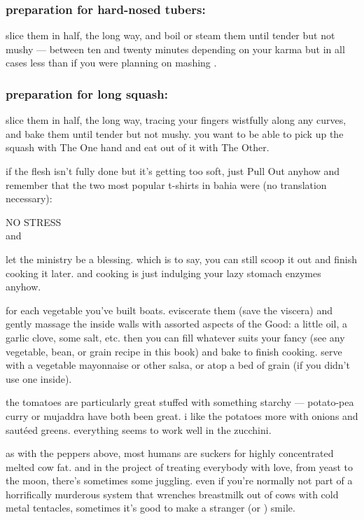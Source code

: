 \subsubsection{preparation for hard-nosed tubers:}
slice them in half, the long way, and boil or steam them until tender but not 
mushy --- between ten and twenty minutes depending on your karma but in all 
cases less than if you were planning on mashing .

\subsubsection{preparation for long squash:}
slice them in half, the long way, tracing your fingers wistfully along any 
curves, and bake them until tender but not mushy. you want to be able to pick 
up the squash with The One hand and eat out of it with The Other.

if the flesh isn't fully done but it's getting too soft, just Pull Out anyhow 
and remember that the two most popular t-shirts in bahia were (no translation 
necessary):

\mbox{\hskip2cm}\textsf{NO STRESS}\\
\mbox{\hskip1cm}and\\
\mbox{\hskip2cm}\textsf{}

let the ministry be a blessing. which is to say, you can still scoop it out 
and finish cooking it later. and cooking is just indulging your lazy stomach 
enzymes anyhow. 

for each vegetable you've built boats. eviscerate them (save the viscera) and 
gently massage the inside walls with assorted aspects of the Good: a little 
oil, a garlic clove, some salt, etc. then you can fill whatever suits your 
fancy (see any vegetable, bean, or grain recipe in this book) and bake to 
finish cooking. serve with a vegetable mayonnaise or other salsa, or atop a 
bed of grain (if you didn't use one inside).

the tomatoes are particularly great stuffed with something starchy --- 
potato-pea curry or \gls{mujaddra} have both been 
great. i like the potatoes more with onions and saut\'{e}ed greens. everything 
seems to work well in the zucchini.

as with the peppers above, most humans are suckers for highly concentrated 
melted cow fat. and in the project of treating everybody with love, from yeast 
to the moon, there's sometimes some juggling. even if you're normally not part 
of a horrifically murderous system that wrenches breastmilk out of cows with 
cold metal tentacles, sometimes it's good to make a stranger (or ) smile.

